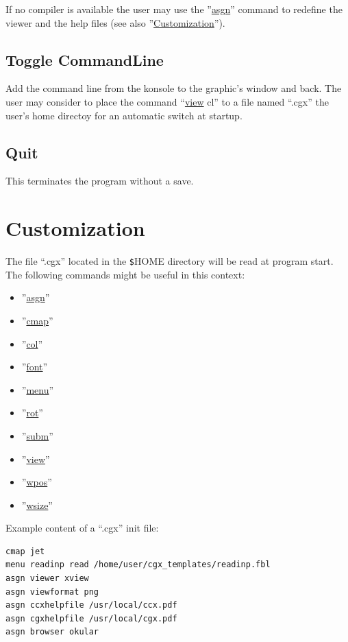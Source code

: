 \documentclass{article}
\providecommand{\htmlref}[2]{\hyperref[#2]{#1}}
\begin{document}
If no compiler is available the user may use the ''\htmlref{asgn}{asgn}'' command to redefine the viewer and the help files (see also ''\htmlref{Customization}{Customization}'').

\subsection{\label{Toggle CommandLine}Toggle CommandLine}
Add the command line from the konsole to the graphic's window and back. The user may consider to place the command ``\htmlref{view}{view} cl'' to a file named ``.cgx'' the user's home directoy for an automatic switch at startup.

\subsection{\label{Quit}Quit}
This terminates the program without a save.

\section{\label{Customization}Customization}
The file ``.cgx'' located in the \verb_$_HOME directory will be read at program start. The following commands might be useful in this context: 
\begin{itemize}
\item ''\htmlref{asgn}{asgn}''
\item ''\htmlref{cmap}{cmap}''
\item ''\htmlref{col}{col}''
\item ''\htmlref{font}{font}''
\item ''\htmlref{menu}{menu}''
\item ''\htmlref{rot}{rot}''
\item ''\htmlref{subm}{subm}''
\item ''\htmlref{view}{view}''
\item ''\htmlref{wpos}{wpos}''
\item ''\htmlref{wsize}{wsize}''
\end{itemize}
Example content of a ``.cgx'' init file:
\begin{verbatim}
cmap jet
menu readinp read /home/user/cgx_templates/readinp.fbl
asgn viewer xview
asgn viewformat png
asgn ccxhelpfile /usr/local/ccx.pdf
asgn cgxhelpfile /usr/local/cgx.pdf
asgn browser okular
\end{verbatim}
\end{document}
